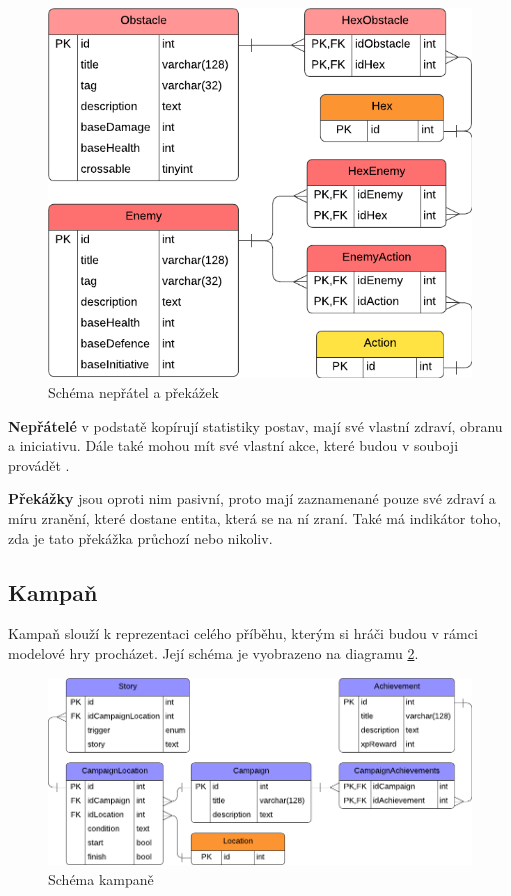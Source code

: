 \begin{figure}[h]
    \centering
    \includegraphics{../../shared/diagrams/er_enemy_obstacle.pdf}
    \caption{Schéma nepřátel a překážek}
    \label{diag:er_enemy_obstacle}
\end{figure}

\textbf{Nepřátelé} v podstatě kopírují statistiky postav, mají své vlastní zdraví, obranu a iniciativu. Dále také mohou mít své vlastní akce, které budou v souboji provádět .

\textbf{Překážky} jsou oproti nim pasivní, proto mají zaznamenané pouze své zdraví a míru zranění, které dostane entita, která se na ní zraní. Také má indikátor toho, zda je tato překážka průchozí  nebo nikoliv.


\subsection{Kampaň}
\label{subsec:schema_campaign}

Kampaň slouží k reprezentaci celého příběhu, kterým si hráči budou v rámci modelové hry procházet. Její schéma je vyobrazeno na diagramu \ref{diag:er_campaign}.

\begin{figure}[h]
    \centering
    \includegraphics[scale=0.8]{../../shared/diagrams/er_campaign.pdf}
    \caption{Schéma kampaně}
    \label{diag:er_campaign}
\end{figure}

